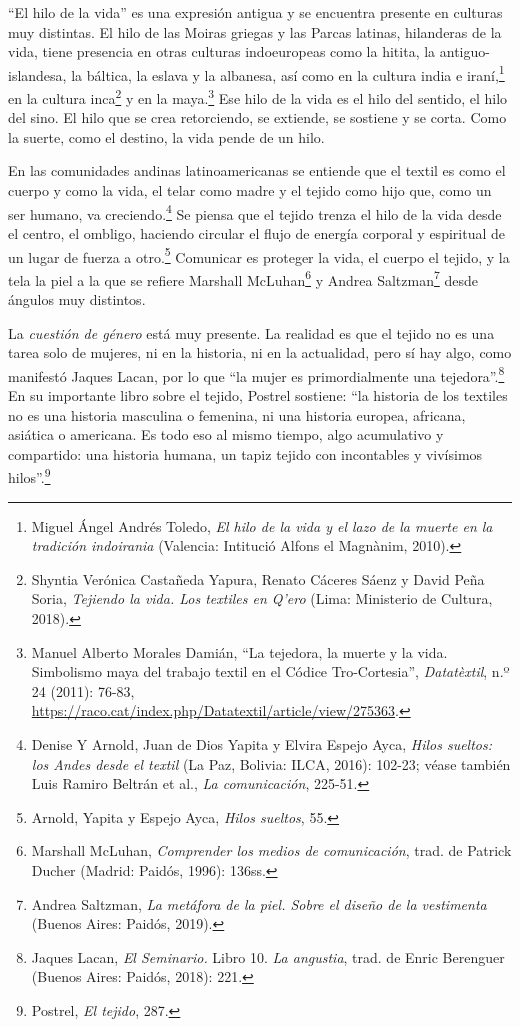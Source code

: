 \documentclass{tufte-handout}
\begin{document}
``El hilo de la vida'' es una expresión antigua y se encuentra presente
en culturas muy distintas. El hilo de las Moiras griegas y las Parcas
latinas, hilanderas de la vida, tiene presencia en otras culturas
indoeuropeas como la hitita, la antiguo-islandesa, la báltica, la eslava
y la albanesa, así como en la cultura india e iraní,\footnote{Miguel
  Ángel Andrés Toledo, \emph{El hilo de la vida y el lazo de la muerte
  en la tradición indoirania} (Valencia: Intitució Alfons el Magnànim,
  2010).} en la cultura inca\footnote{Shyntia Verónica Castañeda Yapura,
  Renato Cáceres Sáenz y David Peña Soria, \emph{Tejiendo la vida. Los
  textiles en Q'ero} (Lima: Ministerio de Cultura, 2018).} y en la
maya.\footnote{Manuel Alberto Morales Damián, ``La tejedora, la muerte y
  la vida. Simbolismo maya del trabajo textil en el Códice
  Tro-Cortesia'', \emph{Datatèxtil}, n.º 24 (2011): 76-83,
  \url{https://raco.cat/index.php/Datatextil/article/view/275363}.} Ese hilo
de la vida es el hilo del sentido, el hilo del sino. El hilo que se crea
retorciendo, se extiende, se sostiene y se corta. Como la suerte, como
el destino, la vida pende de un hilo.

En las comunidades andinas latinoamericanas se entiende que el textil es
como el cuerpo y como la vida, el telar como madre y el tejido como hijo
que, como un ser humano, va creciendo.\footnote{Denise Y Arnold, Juan de
  Dios Yapita y Elvira Espejo Ayca, \emph{Hilos sueltos: los Andes desde
  el textil} (La Paz, Bolivia: ILCA, 2016): 102-23; véase también Luis
  Ramiro Beltrán et al., \emph{La comunicación}, 225-51.} Se piensa que
el tejido trenza el hilo de la vida desde el centro, el ombligo,
haciendo circular el flujo de energía corporal y espiritual de un lugar
de fuerza a otro.\footnote{Arnold, Yapita y Espejo Ayca, \emph{Hilos
  sueltos}, 55.} Comunicar es proteger la vida, el cuerpo el tejido, y
la tela la piel a la que se refiere Marshall McLuhan\footnote{Marshall
  McLuhan, \emph{Comprender los medios de comunicación}, trad. de
  Patrick Ducher (Madrid: Paidós, 1996): 136ss.} y Andrea
Saltzman\footnote{Andrea Saltzman, \emph{La metáfora de la piel. Sobre
  el diseño de la vestimenta} (Buenos Aires: Paidós, 2019).} desde
ángulos muy distintos.

La \emph{cuestión de género} está muy presente. La realidad es que el
tejido no es una tarea solo de mujeres, ni en la historia, ni en la
actualidad, pero sí hay algo, como manifestó Jaques Lacan, por lo que
``la mujer es primordialmente una tejedora''.\footnote{Jaques Lacan,
  \emph{El Seminario.} Libro 10. \emph{La angustia}, trad. de Enric
  Berenguer (Buenos Aires: Paidós, 2018): 221.} En su importante libro
sobre el tejido, Postrel sostiene: ``la historia de los textiles no es
una historia masculina o femenina, ni una historia europea, africana,
asiática o americana. Es todo eso al mismo tiempo, algo acumulativo y
compartido: una historia humana, un tapiz tejido con incontables y
vivísimos hilos''.\footnote{Postrel, \emph{El tejido}, 287.}
\end{document}

